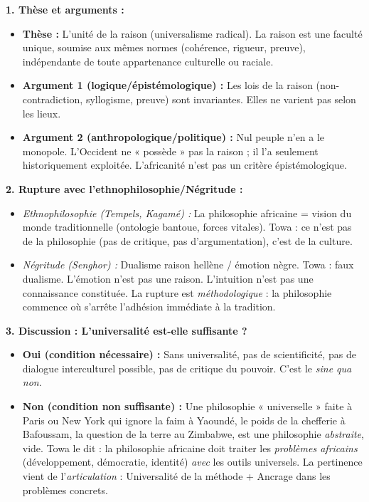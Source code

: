 \documentclass[11pt]{article}
\begin{document}
\begin{corrige}
\textbf{1. Thèse et arguments :}
\begin{itemize}
\item \textbf{Thèse :} L'unité de la raison (universalisme radical). La raison est une faculté unique, soumise aux mêmes normes (cohérence, rigueur, preuve), indépendante de toute appartenance culturelle ou raciale.
\item \textbf{Argument 1 (logique/épistémologique) :} Les lois de la raison (non-contradiction, syllogisme, preuve) sont invariantes. Elles ne varient pas selon les lieux.
\item \textbf{Argument 2 (anthropologique/politique) :} Nul peuple n'en a le monopole. L'Occident ne « possède » pas la raison ; il l'a seulement historiquement exploitée. L'africanité n'est pas un critère épistémologique.
\end{itemize}

\textbf{2. Rupture avec l'ethnophilosophie/Négritude :}
\begin{itemize}
\item \emph{Ethnophilosophie (Tempels, Kagamé) :} La philosophie africaine = vision du monde traditionnelle (ontologie bantoue, forces vitales). Towa : ce n'est pas de la philosophie (pas de critique, pas d'argumentation), c'est de la culture.
\item \emph{Négritude (Senghor) :} Dualisme raison hellène / émotion nègre. Towa : faux dualisme. L'émotion n'est pas une raison. L'intuition n'est pas une connaissance constituée. La rupture est \emph{méthodologique} : la philosophie commence où s'arrête l'adhésion immédiate à la tradition.
\end{itemize}

\textbf{3. Discussion : L'universalité est-elle suffisante ?}
\begin{itemize}
\item \textbf{Oui (condition nécessaire) :} Sans universalité, pas de scientificité, pas de dialogue interculturel possible, pas de critique du pouvoir. C'est le \emph{sine qua non}.
\item \textbf{Non (condition non suffisante) :} Une philosophie « universelle » faite à Paris ou New York qui ignore la faim à Yaoundé, le poids de la chefferie à Bafoussam, la question de la terre au Zimbabwe, est une philosophie \emph{abstraite}, vide. Towa le dit : la philosophie africaine doit traiter les \emph{problèmes africains} (développement, démocratie, identité) \emph{avec} les outils universels. La pertinence vient de l'\emph{articulation} : Universalité de la méthode + Ancrage dans les problèmes concrets.
\end{itemize}
\end{corrige}
\end{document}
